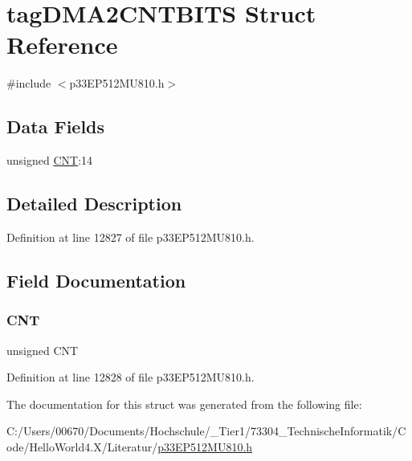 \hypertarget{structtag_d_m_a2_c_n_t_b_i_t_s}{}\section{tag\+D\+M\+A2\+C\+N\+T\+B\+I\+TS Struct Reference}
\label{structtag_d_m_a2_c_n_t_b_i_t_s}


{\ttfamily \#include $<$p33\+E\+P512\+M\+U810.\+h$>$}

\subsection*{Data Fields}
\begin{DoxyCompactItemize}
\item 
unsigned \hyperlink{structtag_d_m_a2_c_n_t_b_i_t_s_a30be39d82c244f19fd98dd74227487f6}{C\+NT}\+:14
\end{DoxyCompactItemize}


\subsection{Detailed Description}


Definition at line 12827 of file p33\+E\+P512\+M\+U810.\+h.



\subsection{Field Documentation}
\mbox{\label{structtag_d_m_a2_c_n_t_b_i_t_s_a30be39d82c244f19fd98dd74227487f6}} 
\subsubsection{\texorpdfstring{C\+NT}{CNT}}
{\footnotesize\ttfamily unsigned C\+NT}



Definition at line 12828 of file p33\+E\+P512\+M\+U810.\+h.



The documentation for this struct was generated from the following file\+:\begin{DoxyCompactItemize}
\item 
C\+:/\+Users/00670/\+Documents/\+Hochschule/\+\_\+\+Tier1/73304\+\_\+\+Technische\+Informatik/\+Code/\+Hello\+World4.\+X/\+Literatur/\hyperlink{p33_e_p512_m_u810_8h}{p33\+E\+P512\+M\+U810.\+h}\end{DoxyCompactItemize}
